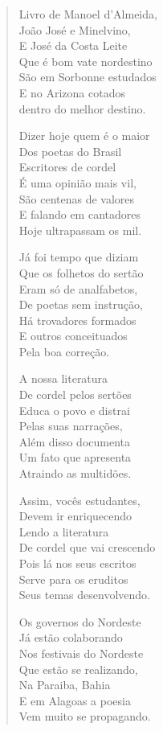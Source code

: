 \begin{verse}
Livro de Manoel d'Almeida, \\
João José e Minelvino, \\
E José da Costa Leite \\
Que é bom vate nordestino \\
São em Sorbonne estudados \\
E no Arizona cotados \\
dentro do melhor destino. 

Dizer hoje quem é o maior \\
Dos poetas do Brasil \\
Escritores de cordel \\
É uma opinião mais vil, \\
São centenas de valores \\
E falando em cantadores \\
Hoje ultrapassam os mil. 

Já foi tempo que diziam \\
Que os folhetos do sertão \\
Eram só de analfabetos, \\
De poetas sem instrução, \\
Há trovadores formados \\
E outros conceituados \\
Pela boa correção. 
\pagebreak

A nossa literatura \\
De cordel pelos sertões \\
Educa o povo e distrai \\
Pelas suas narrações, \\
Além disso documenta \\
Um fato que apresenta \\
Atraindo as multidões. 

Assim, vocês estudantes, \\
Devem ir enriquecendo \\
Lendo a literatura \\
De cordel que vai crescendo \\
Pois lá nos seus escritos \\
Serve para os eruditos \\
Seus temas desenvolvendo. 

Os governos do Nordeste \\
Já estão colaborando \\
Nos festivais do Nordeste \\
Que estão se realizando, \\
Na Paraiba, Bahia \\
E em Alagoas a poesia \\
Vem muito se propagando. 


\end{verse}
